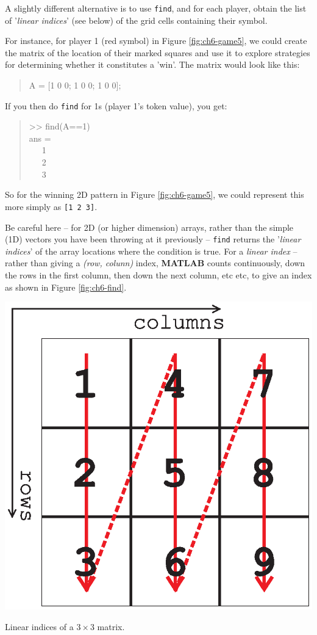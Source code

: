 \documentclass{tufte-book} %
\newenvironment{docspec}{\begin{quotation}\ttfamily\parskip0pt\parindent0pt\ignorespaces}{\end{quotation}}
\begin{document}
A slightly different alternative is to use \texttt{find}, and for each player, obtain the list of '\textit{linear indices}' (see below) of the grid cells containing their symbol.

For instance, for player 1 (red symbol)  in Figure \ref{fig:ch6-game5}, we could create the matrix of the location of their marked squares and use it to explore strategies for determining whether it constitutes a 'win'. The matrix would look like this:
\begin{docspec}
A = [1 0 0; 1 0 0; 1 0 0];
\end{docspec}
If you then do \texttt{find} for 1s (player 1's token value), you get:
\begin{docspec}
>> find(A==1)\\
ans =\\
\ \ \      1\\
\ \ \      2\\
\ \ \      3
\end{docspec}
So for the winning 2D pattern in Figure \ref{fig:ch6-game5},  we could represent this more simply as \texttt{[1 2 3]}. 

Be careful here -- for 2D (or higher dimension) arrays, rather than the simple (1D) vectors you have been throwing at it previously -- \texttt{find} returns the '\textit{linear indices}' of the array locations where the condition is true. For a \textit{linear index} -- rather than giving a \textit{(row, colunn)} index, \textbf{MATLAB} counts continuously, down the rows in the first column, then down the next column, etc etc, to give an index as shown in Figure \ref{fig:ch6-find}.

\begin{marginfigure}[-1.0in]
\includegraphics[width=\linewidth]{ch6-find.eps}
\caption{Linear indices of a \(3\times 3\) matrix.}
\label{fig:ch6-find}
\end{marginfigure}
\end{document}
